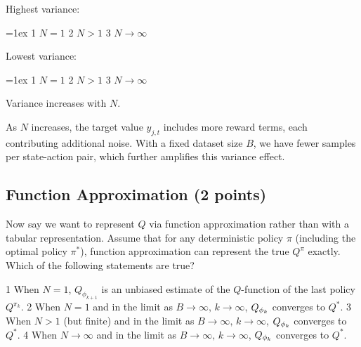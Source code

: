\documentclass{article}
\newif\ifsolutions
\begin{document}
\def\highest{3} %
\def\lowest{1} %
\ifsolutions\solve\thesubsection\fi
\begin{minipage}{0.49\linewidth}
Highest variance:\smallskip
\begin{itemize}\itemsep=1ex
    \checkeditem\highest1 $N = 1$
    \checkeditem\highest2 $N > 1$
    \checkeditem\highest3 $N \to \infty$
\end{itemize}
\end{minipage}
\begin{minipage}{0.49\linewidth}
Lowest variance:\smallskip
\begin{itemize}\itemsep=1ex
    \checkeditem\lowest1 $N = 1$
    \checkeditem\lowest2 $N > 1$
    \checkeditem\lowest3 $N \to \infty$
\end{itemize}
\end{minipage}

\begin{tcolorbox}[answerbox, parbox=false]
  Variance increases with $N$.

  As $N$ increases, the target value $y_{j,t}$ includes more reward terms, each contributing additional noise. With a fixed dataset size $B$, we have fewer samples per state-action pair, which further amplifies this variance effect.
\end{tcolorbox}

\subsection{Function Approximation (2 points)}
\label{q:function_approximation}
Now say we want to represent $Q$ via function approximation rather than with a tabular representation. Assume that for any deterministic policy $\pi$ (including the optimal policy $\pi^*$), function approximation can represent the true $Q^\pi$ exactly.
Which of the following statements are true?

\def\answer{234} %
\ifsolutions\solve\thesubsection\fi
\begin{itemize}
    \checkeditem\answer1 When $N = 1$, $Q_{\phi_{k+1}}$ is an unbiased estimate of the $Q$-function of the last policy $Q^{\pi_k}$.
    \checkeditem\answer2 When $N = 1$ and in the limit as $B\to\infty,\,k \to \infty$, $Q_{\phi_k}$ converges to $Q^*$.
    \checkeditem\answer3 When $N > 1$ (but finite) and in the limit as $B\to\infty,\,k \to \infty$, $Q_{\phi_k}$ converges to $Q^*$.
    \checkeditem\answer4 When $N \to \infty$ and in the limit as $B \to \infty,\,k \to \infty$, $Q_{\phi_k}$ converges to $Q^*$.
\end{itemize}
\end{document}
